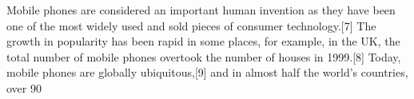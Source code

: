 \documentclass{article}
\begin{document}
	Mobile phones are considered an important human invention as they have been one of the most widely used and sold pieces of consumer technology.[7] The growth in popularity has been rapid in some places, for example, in the UK, the total number of mobile phones overtook the number of houses in 1999.[8] Today, mobile phones are globally ubiquitous,[9] and in almost half the world's countries, over 90%
\end{document}
